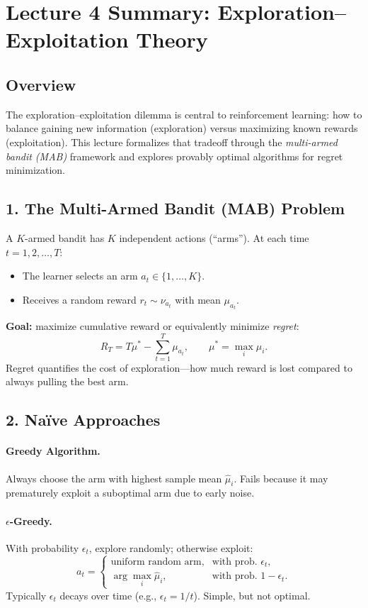 \documentclass[12pt]{article}
\begin{document}
\psetheader %

\section*{Lecture 4 Summary: Exploration--Exploitation Theory}

\subsection*{Overview}
The exploration--exploitation dilemma is central to reinforcement learning: how to
balance gaining new information (exploration) versus maximizing known rewards (exploitation).
This lecture formalizes that tradeoff through the \emph{multi-armed bandit (MAB)}
framework and explores provably optimal algorithms for regret minimization.

\subsection*{1. The Multi-Armed Bandit (MAB) Problem}
A $K$-armed bandit has $K$ independent actions (“arms”).
At each time $t = 1, 2, \dots, T$:
\begin{itemize}
		\item The learner selects an arm $a_t \in \{1, \dots, K\}$.
		\item Receives a random reward $r_t \sim \nu_{a_t}$ with mean $\mu_{a_t}$.
\end{itemize}

\textbf{Goal:} maximize cumulative reward or equivalently minimize \emph{regret}:
\[
		R_T = T\mu^* - \sum_{t=1}^T \mu_{a_t}, \qquad \mu^* = \max_i \mu_i.
\]
Regret quantifies the cost of exploration—how much reward is lost compared to always
pulling the best arm.

\subsection*{2. Naïve Approaches}

\paragraph{Greedy Algorithm.}
Always choose the arm with highest sample mean $\hat{\mu}_i$.
Fails because it may prematurely exploit a suboptimal arm due to early noise.

\paragraph{$\epsilon$-Greedy.}
With probability $\epsilon_t$, explore randomly; otherwise exploit:
\[
		a_t =
		\begin{cases}
				\text{uniform random arm}, & \text{with prob. } \epsilon_t,\\[4pt]
				\arg\max_i \hat{\mu}_i, & \text{with prob. } 1-\epsilon_t.
		\end{cases}
\]
Typically $\epsilon_t$ decays over time (e.g., $\epsilon_t = 1/t$).
Simple, but not optimal.
\end{document}
